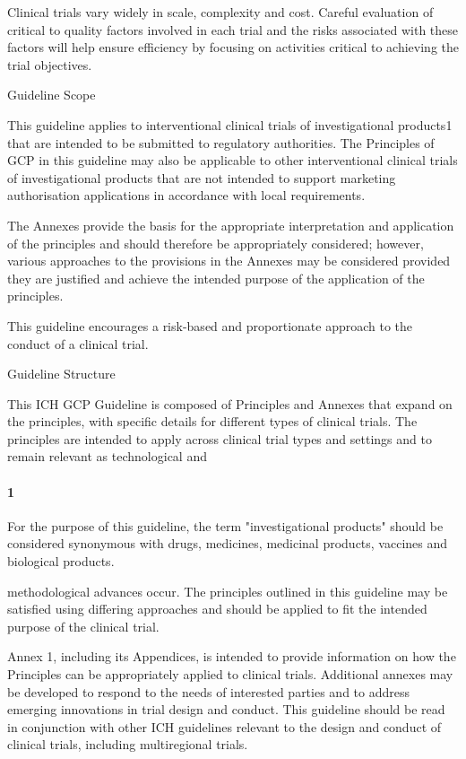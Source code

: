 \documentclass[11pt]{article}
\begin{document}
Clinical trials vary widely in scale, complexity and cost. Careful evaluation of critical to quality factors involved in each trial and the risks associated with these factors will help ensure efficiency by focusing on activities critical to achieving the trial objectives.


Guideline Scope


This guideline applies to interventional clinical trials of investigational products1 that are intended to be submitted to regulatory authorities. The Principles of GCP in this guideline may also be applicable to other interventional clinical trials of investigational products that are not intended to support marketing authorisation applications in accordance with local requirements.


The Annexes provide the basis for the appropriate interpretation and application of the principles and should therefore be appropriately considered; however, various approaches to the provisions in the Annexes may be considered provided they are justified and achieve the intended purpose of the application of the principles.


This guideline encourages a risk-based and proportionate approach to the conduct of a clinical trial.


Guideline Structure


This ICH GCP Guideline is composed of Principles and Annexes that expand on the principles, with specific details for different types of clinical trials. The principles are intended to apply across clinical trial types and settings and to remain relevant as technological and


\paragraph{1} For the purpose of this guideline, the term "investigational products" should be considered synonymous with drugs, medicines, medicinal products, vaccines and biological products.

methodological advances occur. The principles outlined in this guideline may be satisfied using differing approaches and should be applied to fit the intended purpose of the clinical trial.


Annex 1, including its Appendices, is intended to provide information on how the Principles can be appropriately applied to clinical trials. Additional annexes may be developed to respond to the needs of interested parties and to address emerging innovations in trial design and conduct. This guideline should be read in conjunction with other ICH guidelines relevant to the design and conduct of clinical trials, including multiregional trials.
\end{document}

